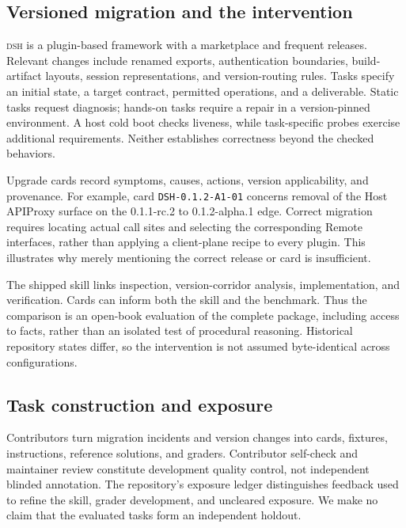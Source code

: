 \documentclass[11pt]{article}
\newcommand{\framework}{\textsc{dsh}}
\begin{document}
\subsection{Versioned migration and the intervention}\label{sec:intervention}
\framework{} is a plugin-based framework with a marketplace and frequent releases. Relevant changes include renamed exports, authentication boundaries, build-artifact layouts, session representations, and version-routing rules. Tasks specify an initial state, a target contract, permitted operations, and a deliverable. Static tasks request diagnosis; hands-on tasks require a repair in a version-pinned environment. A host cold boot checks liveness, while task-specific probes exercise additional requirements. Neither establishes correctness beyond the checked behaviors.

Upgrade cards record symptoms, causes, actions, version applicability, and provenance. For example, card \texttt{DSH-0.1.2-A1-01} concerns removal of the Host APIProxy surface on the 0.1.1-rc.2 to 0.1.2-alpha.1 edge. Correct migration requires locating actual call sites and selecting the corresponding Remote interfaces, rather than applying a client-plane recipe to every plugin. This illustrates why merely mentioning the correct release or card is insufficient.

The shipped skill links inspection, version-corridor analysis, implementation, and verification. Cards can inform both the skill and the benchmark. Thus the comparison is an open-book evaluation of the complete package, including access to facts, rather than an isolated test of procedural reasoning. Historical repository states differ, so the intervention is not assumed byte-identical across configurations.

\subsection{Task construction and exposure}\label{sec:exposure}
Contributors turn migration incidents and version changes into cards, fixtures, instructions, reference solutions, and graders. Contributor self-check and maintainer review constitute development quality control, not independent blinded annotation. The repository's exposure ledger distinguishes feedback used to refine the skill, grader development, and uncleared exposure. We make no claim that the evaluated tasks form an independent holdout.
\end{document}
